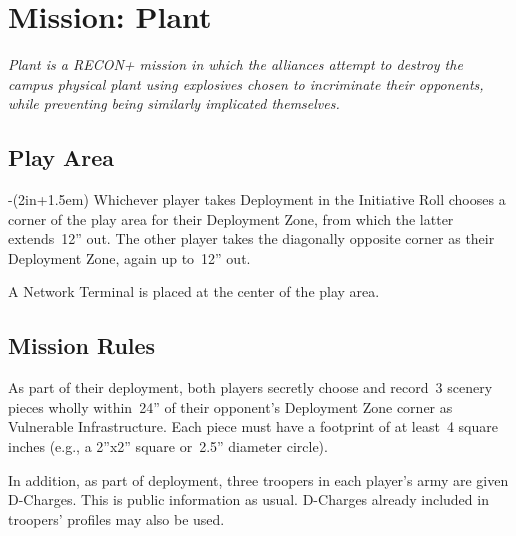 \chapter{Mission: Plant}


\emph{\emph{Plant} is a RECON+ mission in which the alliances attempt
  to destroy the campus physical plant using explosives chosen to
  incriminate their opponents, while preventing being similarly
  implicated themselves.}


\section{Play Area}
\vspace{-2\parskip}
\noindent\begin{stdminipage}{\linewidth-(2in+1.5em)}
\vspace{0pt}   
\noindent
Whichever player takes Deployment in the Initiative Roll chooses a
corner of the play area for their Deployment Zone, from which the
latter extends~12'' out.  The other player takes the diagonally
opposite corner as their Deployment Zone, again up to~12'' out.

A Network Terminal is placed at the center of the play area.

\section{Mission Rules}
As part of their deployment, both players secretly choose and record~3
scenery pieces wholly within~24'' of their opponent's Deployment Zone
corner as Vulnerable Infrastructure.  Each piece must have a footprint
of at least~4 square inches (e.g., a 2''x2'' square or~2.5'' diameter
circle).

In addition, as part of deployment, three troopers in each player's
army are given D-Charges.  This is public information as usual.
D-Charges already included in troopers' profiles may also be used.

\end{stdminipage}
\hfill
